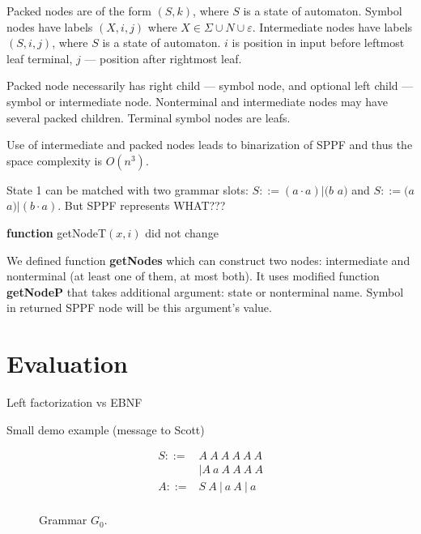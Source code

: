 \documentclass[runningheads,a4paper]{llncs}
\begin{document}
Packed nodes are of the form $(S, k)$, where $S$ is a state of automaton. 
Symbol nodes have labels $(X, i, j)$ where $X \in \Sigma \cup N \cup \varepsilon$. 
Intermediate nodes have labels $ (S, i, j) $, where $S$ is a state of automaton. $i$ is position in input before leftmost leaf terminal, $j$ --- position after rightmost leaf.

Packed node necessarily has right child --- symbol node, and optional left child --- symbol or intermediate node.
Nonterminal and intermediate nodes may have several packed children. 
Terminal symbol nodes are leafs.

Use of intermediate and packed nodes leads to binarization of SPPF and thus the space complexity is $O(n^{3})$.




State 1 can be matched with two grammar slots: $S ::= (a \cdot a)|(b$ $a)$ and $S ::= (a$ $a)|(b \cdot a)$. 
But SPPF represents WHAT???




\textbf{function} getNodeT$(x,i)$ did not change

We defined function \textbf{getNodes} which can construct two nodes: intermediate and nonterminal (at least one of them, at most both).
It uses modified function \textbf{getNodeP} that takes additional argument: state or nonterminal name. Symbol in returned SPPF node will be this argument's value.





\section{Evaluation}

Left factorization vs EBNF

Small demo example (message to Scott)

\begin{figure}[h]
$$
\begin{array}{crcl}
S ::=& A\ A\ A\ A\ A\ A \\
     &|A\ a\ A\ A\ A\ A \\
A ::=& S\ A\ |\ a\ A\ |\ a \\
\end{array}
$$
\caption{Grammar $G_0$.}
\label{testGrammar}
\end{figure}
\end{document}
